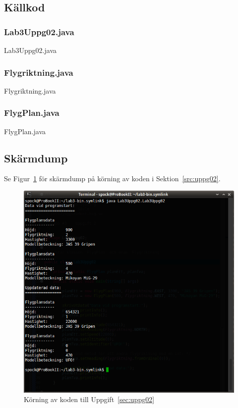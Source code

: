 \subsection{Källkod}
\subsubsection{Lab3Uppg02.java}
\caption{Lab3Uppg02.java}
\label{src:uppg02}

\subsubsection{Flygriktning.java}
\caption{Flygriktning.java}
\label{src:flygriktning}

\subsubsection{FlygPlan.java}
\caption{FlygPlan.java}
\label{src:flygplan}


\subsection{Skärmdump}
Se Figur~\ref{fig:uppg02-screenshot} för skärmdump på körning av koden i
Sektion~\ref{src:uppg02}.

\begin{figure}[htbp]
    \centering
        \includegraphics[width=\linewidth]{img/02.png}
    \caption{Körning av koden till Uppgift~\ref{sec:uppg02}}
    \label{fig:uppg02-screenshot}
\end{figure}

